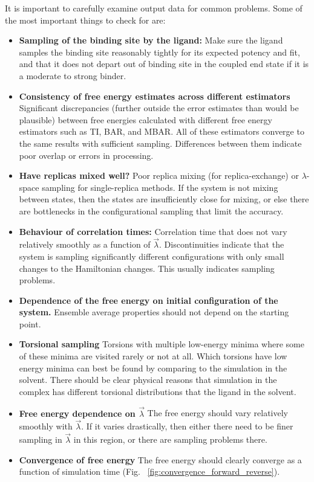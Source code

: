 \documentclass[9pt,bestpractices]{livecoms}
\begin{document}
It is important to carefully examine output data for common problems. Some of the most important things to check for are:
\begin{itemize}
\item \textbf{Sampling of the binding site by the ligand:} Make sure the ligand samples the binding site reasonably tightly for its expected potency and fit, and that it does not depart out of binding site in the coupled end state if it is a moderate to strong binder. 
\item \textbf{Consistency of free energy estimates across different estimators} Significant discrepancies (further outside the error estimates than would be plausible) between free energies calculated with different free energy estimators such as TI, BAR, and MBAR. All of these estimators converge to the same results with sufficient sampling. Differences between them indicate poor overlap or errors in processing.
\item \textbf{Have replicas mixed well?} Poor replica mixing (for replica-exchange) or $\lambda$-space sampling for single-replica methods. If the system is not mixing between states, then the states are insufficiently close for mixing, or else there are bottlenecks in the configurational sampling that limit the accuracy.
\item \textbf{Behaviour of correlation times:} Correlation time that does not vary relatively smoothly as a function of $\vec{\lambda}$. Discontinuities indicate that the system is sampling significantly different configurations with only small changes to the Hamiltonian changes. This usually indicates sampling problems.
\item \textbf{Dependence of the free energy on initial configuration of the system.} Ensemble average properties should not depend on the starting point.
\item \textbf{Torsional sampling} Torsions with multiple low-energy minima where some of these minima are visited rarely or not at all. Which torsions have low energy minima can best be found by comparing to the simulation in the solvent. There should be clear physical reasons that simulation in the complex has different torsional distributions that the ligand in the solvent. 
\item \textbf{Free energy dependence on $\vec{\lambda}$} The free energy should vary relatively smoothly with $\vec{\lambda}$. If it varies drastically, then either there need to be finer sampling in $\vec{\lambda}$ in this region, or there are sampling problems there.
\item \textbf{Convergence of free energy} The free energy should clearly converge as a function of simulation time (Fig. ~\ref{fig:convergence_forward_reverse}).

\end{itemize}
\end{document}
